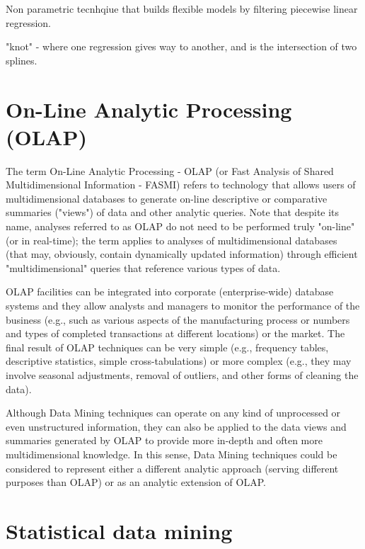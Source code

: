 \documentclass[11pt]{article} %
\begin{document}
Non parametric tecnhqiue that builds flexible models by filtering piecewise linear regression.

"knot" - where one regression gives way to another, and is the intersection of two splines.






\section{On-Line Analytic Processing (OLAP)}


The term On-Line Analytic Processing - OLAP (or Fast Analysis of Shared Multidimensional Information - FASMI) refers to technology that allows users of multidimensional databases to generate on-line descriptive or comparative summaries ("views") of data and other analytic queries. Note that despite its name, analyses referred to as OLAP do not need to be performed truly "on-line" (or in real-time); the term applies to analyses of multidimensional databases (that may, obviously, contain dynamically updated information) through efficient "multidimensional" queries that reference various types of data. 


OLAP facilities can be integrated into corporate (enterprise-wide) database systems and they allow analysts and managers to monitor the performance of the business (e.g., such as various aspects of the manufacturing process or numbers and types of completed transactions at different locations) or the market. The final result of OLAP techniques can be very simple (e.g., frequency tables, descriptive statistics, simple cross-tabulations) or more complex (e.g., they may involve seasonal adjustments, removal of outliers, and other forms of cleaning the data). 


Although Data Mining techniques can operate on any kind of unprocessed or even unstructured information, they can also be applied to the data views and summaries generated by OLAP to provide more in-depth and often more multidimensional knowledge. In this sense, Data Mining techniques could be considered to represent either a different analytic approach (serving different purposes than OLAP) or as an analytic extension of OLAP.




\section{Statistical data mining}
\end{document}
